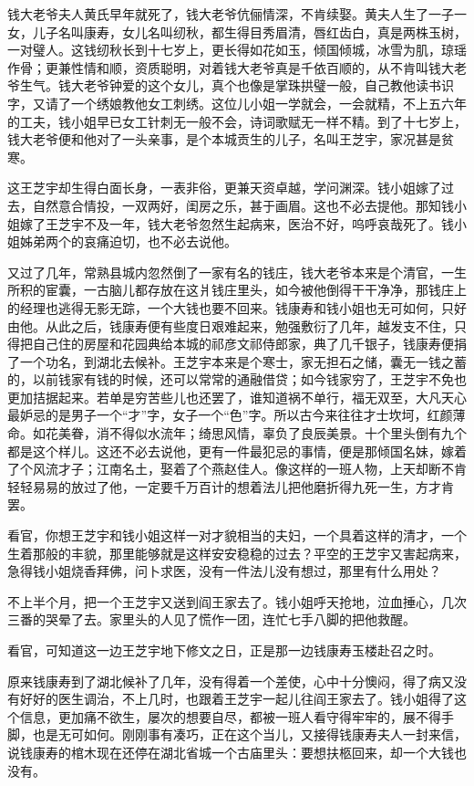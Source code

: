 \documentclass[12pt,UTF8]{ctexbook}
\begin{document}
{{{钱大老爷夫人黄氏早年就死了，钱大老爷伉俪情深，不肯续娶。黄夫人生了一子一女，儿子名叫康寿，女儿名叫纫秋，都生得目秀眉清，唇红齿白，真是两株玉树，一对璧人。这钱纫秋长到十七岁上，更长得如花如玉，倾国倾城，冰雪为肌，琼瑶作骨；更兼性情和顺，资质聪明，对着钱大老爷真是千依百顺的，从不肯叫钱大老爷生气。钱大老爷钟爱的这个女儿，真个也像是掌珠拱璧一般，自己教他读书识字，又请了一个绣娘教他女工刺绣。这位儿小姐一学就会，一会就精，不上五六年的工夫，钱小姐早已女工针刺无一般不会，诗词歌赋无一样不精。到了十七岁上，钱大老爷便和他对了一头亲事，是个本城贡生的儿子，名叫王芝宇，家况甚是贫寒。

这王芝宇却生得白面长身，一表非俗，更兼天资卓越，学问渊深。钱小姐嫁了过去，自然意合情投，一双两好，闺房之乐，甚于画眉。这也不必去提他。那知钱小姐嫁了王芝宇不及一年，钱大老爷忽然生起病来，医治不好，呜呼哀哉死了。钱小姐姊弟两个的哀痛迫切，也不必去说他。

又过了几年，常熟县城内忽然倒了一家有名的钱庄，钱大老爷本来是个清官，一生所积的宦囊，一古脑儿都存放在这爿钱庄里头，如今被他倒得干干净净，那钱庄上的经理也逃得无影无踪，一个大钱也要不回来。钱康寿和钱小姐也无可如何，只好由他。从此之后，钱康寿便有些度日艰难起来，勉强敷衍了几年，越发支不住，只得把自己住的房屋和花园典给本城的祁彦文祁侍郎家，典了几千银子，钱康寿便捐了一个功名，到湖北去候补。王芝宇本来是个寒士，家无担石之储，囊无一钱之蓄的，以前钱家有钱的时候，还可以常常的通融借贷；如今钱家穷了，王芝宇不免也更加拮据起来。若单是穷苦些儿也还罢了，谁知道祸不单行，福无双至，大凡天心最妒忌的是男子一个“才”字，女子一个“色”字。所以古今来往往才士坎坷，红颜薄命。如花美眷，消不得似水流年；绮思风情，辜负了良辰美景。十个里头倒有九个都是这个样儿。这还不必去说他，更有一件最犯忌的事情，便是那倾国名妹，嫁着了个风流才子；江南名土，娶着了个燕赵佳人。像这样的一班人物，上天却断不肯轻轻易易的放过了他，一定要千万百计的想着法儿把他磨折得九死一生，方才肯罢。

看官，你想王芝宇和钱小姐这样一对才貌相当的夫妇，一个具着这样的清才，一个生着那般的丰貌，那里能够就是这样安安稳稳的过去？平空的王芝宇又害起病来，急得钱小姐烧香拜佛，问卜求医，没有一件法儿没有想过，那里有什么用处？

不上半个月，把一个王芝宇又送到阎王家去了。钱小姐呼天抢地，泣血捶心，几次三番的哭晕了去。家里头的人见了慌作一团，连忙七手八脚的把他救醒。

看官，可知道这一边王芝宇地下修文之日，正是那一边钱康寿玉楼赴召之时。

原来钱康寿到了湖北候补了几年，没有得着一个差使，心中十分懊闷，得了病又没有好好的医生调治，不上几时，也跟着王芝宇一起儿往阎王家去了。钱小姐得了这个信息，更加痛不欲生，屡次的想要自尽，都被一班人看守得牢牢的，展不得手脚，也是无可如何。刚刚事有凑巧，正在这个当儿，又接得钱康寿夫人一封来信，说钱康寿的棺木现在还停在湖北省城一个古庙里头：要想扶柩回来，却一个大钱也没有。

}}}
\end{document}

